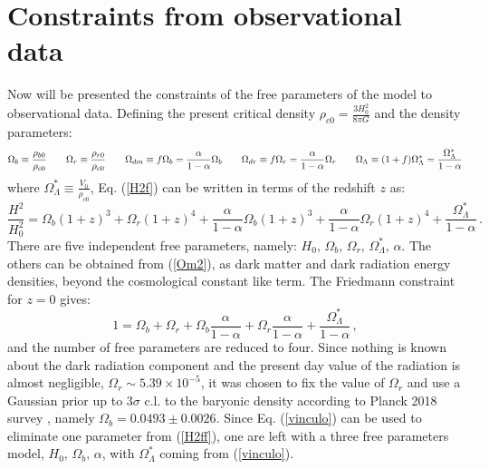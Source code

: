 \documentclass[preprintnumbers,amsmath,amssymb,nofootinbib]{revtex4}
\begin{document}
\section{Constraints from observational data}

Now will be presented the constraints of the free parameters of the model to observational data. Defining the present critical density $\rho_{c0} = \frac{3H_0^2}{8\pi G}$ and the density parameters:
\begin{equation}
    \Omega_b\equiv \frac{\rho_{b0}}{\rho_{c0}}\hspace{0.7cm} \Omega_r\equiv \frac{\rho_{r0}}{\rho_{c0}}\hspace{0.7cm} 
    \Omega_{dm}\equiv f\Omega_b = \frac{\alpha}{1-\alpha}\Omega_{b} 
    \hspace{0.7cm}
    \Omega_{dr}\equiv f\Omega_r = \frac{\alpha}{1-\alpha}\Omega_{r} \hspace{0.7cm}
    \Omega_\Lambda \equiv (1+f)\Omega^*_\Lambda = \frac{\Omega^*_\Lambda}{1-\alpha}\label{Om2}
\end{equation}
where $\Omega^*_\Lambda\equiv \frac{V_0}{\rho_{c0}}$, Eq. (\ref{H2f}) can be written in terms of the redshift $z$ as:
\begin{equation}
    \frac{H^2}{H_0^2}=\Omega_{b}(1+z)^3 + \Omega_{r}(1+z)^4 + \frac{\alpha}{1-\alpha}\Omega_{b}(1+z)^3 + \frac{\alpha}{1-\alpha}\Omega_{r}(1+z)^4 + \frac{\Omega^*_\Lambda}{1-\alpha}\,.\label{H2ff} 
\end{equation}
There are five independent free parameters, namely: $H_0,\,\Omega_b,\,\Omega_r,\,\Omega_\Lambda^*,\,\alpha$. The others can be obtained from (\ref{Om2}), as dark matter and dark radiation energy densities, beyond the cosmological constant like term. The Friedmann constraint for $z=0$ gives:
\begin{equation}
    1 = \Omega_b + \Omega_r + \Omega_b\frac{\alpha}{1-\alpha} + \Omega_r\frac{\alpha}{1-\alpha}  + \frac{\Omega_\Lambda^*}{1-\alpha}\,,\label{vinculo}
\end{equation}
and the number of free parameters are reduced to four. Since nothing is known about the dark radiation component and the present day value of the radiation is almost negligible, $\Omega_r \sim 5.39\times 10^{-5}$, it was chosen to fix the value of $\Omega_r$ and use a Gaussian prior up to $3\sigma$ c.l. to the baryonic density according to Planck 2018 survey \cite{Planck2018}, namely $\Omega_b = 0.0493 \pm 0.0026$. Since Eq. (\ref{vinculo}) can be used to eliminate one parameter from (\ref{H2ff}), one are left with a three free parameters model,  $H_0,\,\Omega_b,\,\alpha$, with $\Omega^*_\Lambda$ coming from (\ref{vinculo}).
\end{document}
